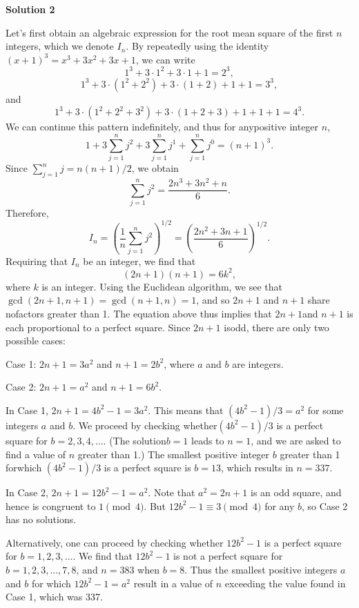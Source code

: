 \begin{enumerate}
 



\textbf{Solution 2}

Let's first obtain an algebraic expression for the root mean square of the first $n$ integers, which we denote $I_n$. By repeatedly using the identity$(x+1)^3 = x^3 + 3x^2 + 3x + 1$, we can write
 \[1^3 + 3\cdot 1^2 + 3 \cdot 1 + 1 = 2^3,\]
 \[1^3 + 3 \cdot(1^2 + 2^2) + 3 \cdot (1 + 2) + 1 + 1  = 3^3,\] and
 \[1^3 + 3\cdot(1^2 + 2^2 + 3^2) + 3 \cdot (1 + 2 + 3) + 1 + 1 + 1 = 4^3.\] We can continue this pattern indefinitely, and thus for anypositive integer $n$,
 \[1 + 3\sum_{j=1}^n j^2 + 3 \sum_{j=1}^n j^1 + \sum_{j=1}^n j^0 = (n+1)^3.\]Since $\sum_{j=1}^n j  = n(n+1)/2$, we obtain
 \[\sum_{j=1}^n j^2 = \frac{2n^3 + 3n^2 + n}{6}.\]Therefore,
 \[I_n = \left(\frac{1}{n} \sum_{j=1}^n j^2\right)^{1/2} = \left(\frac{2n^2 + 3n + 1}{6}\right)^{1/2}.\]Requiring that $I_n$ be an integer, we find that
 \[(2n+1 ) (n+1) = 6k^2,\] where $k$ is an integer. Using the Euclidean algorithm, we see that$\gcd(2n+1, n+1) = \gcd(n+1,n) = 1$, and so $2n+1$ and $n+1$ share nofactors greater than 1. The equation above thus implies that $2n+1$and $n+1$ is each proportional to a perfect square. Since $2n+1$ isodd, there are only two possible cases:

 Case 1: $2n+1 = 3 a^2$ and $n+1 = 2b^2$, where $a$ and $b$ are integers.

 Case 2: $2n+1 = a^2$ and $n+1 = 6b^2$.

 In Case 1,  $2n+1 = 4b^2 -1 = 3a^2$. This means that $(4b^2 -1)/3 = a^2$ for some integers $a$ and $b$. We proceed by checking whether$(4b^2-1)/3$ is a perfect square for $b=2, 3, 4, \dots$. (The solution$b=1$ leads to $n=1$, and we are asked to find a value of $n$ greater than 1.) The smallest positive integer $b$ greater than 1 forwhich $(4b^2-1)/3$ is a perfect square is $b=13$, which results in $n=337$.

 In Case 2, $2n+1 = 12b^2 - 1 = a^2$. Note that $a^2 = 2n+1$ is an odd square, and hence is congruent to $1 \pmod 4$. But $12b^2 -1 \equiv 3 \pmod 4$ for any $b$, so Case 2 has no solutions.

 Alternatively, one can proceed by checking whether $12b^2 -1$ is a perfect square for $b=1, 2 ,3 ,\dots$. We find that $12b^2 -1$ is not a perfect square for $b = 1,2, 3, ..., 7, 8$, and $n= 383$ when $b=8$. Thus the smallest positive integers $a$ and $b$ for which $12b^2- 1 = a^2$ result in a value of $n$ exceeding the value found in Case 1, which was 337.


\end{enumerate}
